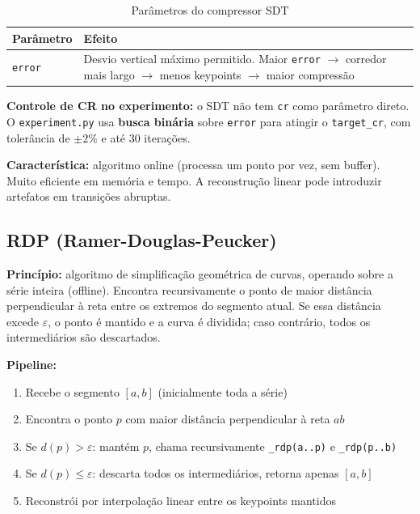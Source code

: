 \documentclass[12pt, a4paper]{article}
\begin{document}
\begin{table}[H]
\centering
\caption{Parâmetros do compressor SDT}
\begin{tabular}{lp{9cm}}
\toprule
\textbf{Parâmetro} & \textbf{Efeito} \\
\midrule
\texttt{error} & Desvio vertical máximo permitido. Maior \texttt{error} $\to$ corredor mais largo $\to$ menos keypoints $\to$ maior compressão \\
\bottomrule
\end{tabular}
\end{table}

\textbf{Controle de CR no experimento:} o SDT não tem \texttt{cr} como parâmetro direto. O \texttt{experiment.py} usa \textbf{busca binária} sobre \texttt{error} para atingir o \texttt{target\_cr}, com tolerância de $\pm 2\%$ e até 30 iterações.

\textbf{Característica:} algoritmo online (processa um ponto por vez, sem buffer). Muito eficiente em memória e tempo. A reconstrução linear pode introduzir artefatos em transições abruptas.

\subsection{RDP (Ramer-Douglas-Peucker)}

\textbf{Princípio:} algoritmo de simplificação geométrica de curvas, operando sobre a série inteira (offline). Encontra recursivamente o ponto de maior distância perpendicular à reta entre os extremos do segmento atual. Se essa distância excede $\varepsilon$, o ponto é mantido e a curva é dividida; caso contrário, todos os intermediários são descartados.

\textbf{Pipeline:}
\begin{enumerate}
    \item Recebe o segmento $[a, b]$ (inicialmente toda a série)
    \item Encontra o ponto $p$ com maior distância perpendicular à reta $ab$
    \item Se $d(p) > \varepsilon$: mantém $p$, chama recursivamente \texttt{\_rdp(a..p)} e \texttt{\_rdp(p..b)}
    \item Se $d(p) \leq \varepsilon$: descarta todos os intermediários, retorna apenas $[a, b]$
    \item Reconstrói por interpolação linear entre os keypoints mantidos
\end{enumerate}
\end{document}
